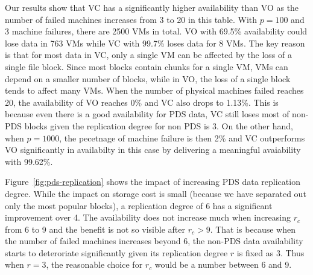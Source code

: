 Our results show that VC has a significantly  higher availability than VO as the number of
failed machines increases from 3 to 20
in this table.
With $p=100$ and 3 machine failures,
there are 2500 VMs in total. VO with 69.5\% availability could lose data in 763 VMs 
while VC with 99.7\% loses data for 8 VMs.
The key reason is that for most data in VC, only a single VM can be affected by
the loss of a single file block. Since most blocks contain chunks for a single
VM, VMs can depend on a smaller number of blocks, while in VO, the loss of a
single block tends to affect many VMs.
When the number of physical machines failed reaches 20, the availability of VO reaches 0\%
and VC also drops to 1.13\%. This is because even there is a good availability for PDS data, VC still
loses most of non-PDS blocks given the replication degree for non PDS is 3.
On the other hand, when $p=1000$, the pecetnage of machine failure is then 2\% and
 VC outperforms VO significantly in availabilty in this case by delivering a meaningful avaiability with 99.62\%.



%
Figure~\ref{fig:pds-replication} shows
the impact of increasing PDS data replication degree. 
While the impact on storage cost is small (because we have separated out only
the most popular blocks),
a replication degree of 6  has a significant improvement over 4. The
availability does not increase much  when increasing
$r_c$ from 6 to 9 and the benefit is not so visible after $r_c>9$. 
That is because when the number of failed machines increases beyond 6, 
the non-PDS data availability starts to deteroriate significantly given its replication degree
$r$ is fixed as 3. Thus when $r=3$, the reasonable choice for $r_c$ would be a number between 6 and 9.
 
